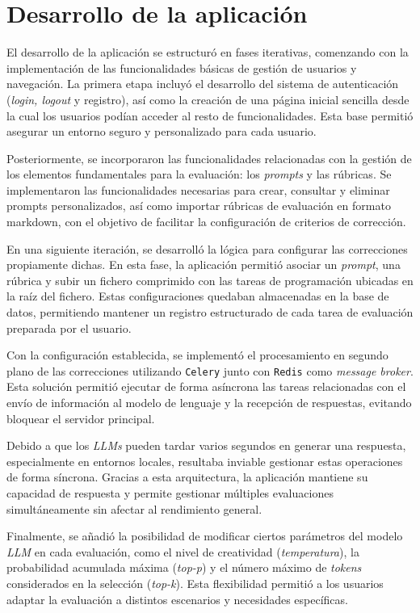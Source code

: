 \section{Desarrollo de la aplicación}

El desarrollo de la aplicación se estructuró en fases iterativas, comenzando con la implementación de las funcionalidades básicas de gestión de usuarios y navegación. La primera etapa incluyó el desarrollo del sistema de autenticación (\textit{login, logout} y registro), así como la creación de una página inicial sencilla desde la cual los usuarios podían acceder al resto de funcionalidades. Esta base permitió asegurar un entorno seguro y personalizado para cada usuario.

Posteriormente, se incorporaron las funcionalidades relacionadas con la gestión de los elementos fundamentales para la evaluación: los \textit{prompts} y las rúbricas. Se implementaron las funcionalidades necesarias para crear, consultar y eliminar prompts personalizados, así como importar rúbricas de evaluación en formato markdown, con el objetivo de facilitar la configuración de criterios de corrección.

En una siguiente iteración, se desarrolló la lógica para configurar las correcciones propiamente dichas. En esta fase, la aplicación permitió asociar un \textit{prompt}, una rúbrica y subir un fichero comprimido con las tareas de programación ubicadas en la raíz del fichero. Estas configuraciones quedaban almacenadas en la base de datos, permitiendo mantener un registro estructurado de cada tarea de evaluación preparada por el usuario.

Con la configuración establecida, se implementó el procesamiento en segundo plano de las correcciones utilizando \texttt{Celery} junto con \texttt{Redis} como \textit{message broker}. Esta solución permitió ejecutar de forma asíncrona las tareas relacionadas con el envío de información al modelo de lenguaje y la recepción de respuestas, evitando bloquear el servidor principal.

Debido a que los \textit{LLMs} pueden tardar varios segundos en generar una respuesta, especialmente en entornos locales, resultaba inviable gestionar estas operaciones de forma síncrona. Gracias a esta arquitectura, la aplicación mantiene su capacidad de respuesta y permite gestionar múltiples evaluaciones simultáneamente sin afectar al rendimiento general.

Finalmente, se añadió la posibilidad de modificar ciertos parámetros del modelo \textit{LLM} en cada evaluación, como el nivel de creatividad (\textit{temperatura}), la probabilidad acumulada máxima (\textit{top-p}) y el número máximo de \textit{tokens} considerados en la selección (\textit{top-k}). Esta flexibilidad permitió a los usuarios adaptar la evaluación a distintos escenarios y necesidades específicas.

